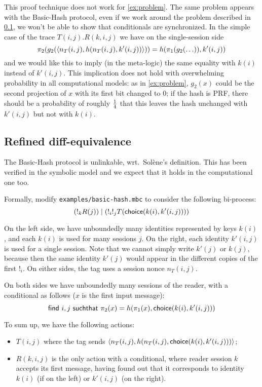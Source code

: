 \begin{example} \label{ex:indep}
  This proof technique does not work for \cref{ex:problem}.
  The same problem appears with the Basic-Hash protocol, even if we work around
the problem described in \cref{sec:refined-diff}, we won't be able to show
that conditionals are synchronized.  In the simple case of the trace
$T(i,j).R(k,i,j)$ we have
on the single-session side
$$\pi_2(g_2(\langle n_T(i,j),h(n_T(i,j),k'(i,j)) \rangle)) =
 h(\pi_1(g_2(\ldots)),k'(i,j))$$
and we would like this to imply (in the meta-logic)
the same equality with $k(i)$ instead of $k'(i,j)$.
This implication does not hold with overwhelming probability in all
computational models: as in \cref{ex:problem}, $g_2(x)$ could be the second
projection of $x$ with its first bit changed to $0$; if the hash is PRF,
there should be a probability of roughly $1 \over 4$ that this leaves
the hash unchanged with $k'(i,j)$ but not with $k(i)$.
\end{example}

\subsection{Refined diff-equivalence} \label{sec:refined-diff}

The Basic-Hash protocol is unlinkable, wrt.\ Solène's definition.
This has been verified in the symbolic model and we expect that it holds
in the computational one too.

Formally, modify \texttt{examples/basic-hash.mbc} to consider the
following bi-process:
$$(!_k R(j)) \mid (!_i !_j T(\mathsf{choice}(k(i),k'(i,j))))$$

On the left side, we have unboundedly many
identities represented by keys $k(i)$, and each $k(i)$ is used for
many sessions $j$.
On the right, each identity $k'(i,j)$ is used for a single session.
Note that we cannot simply write $k'(j)$ or $k(j)$, because then the
same identity $k'(j)$ would appear in the different copies of the
first $!_i$.
On either sides, the tag uses a session nonce $n_T(i,j)$.

On both sides we have unboundedly many sessions of the reader,
with a conditional as follows ($x$ is the first input message):
$$\mathsf{find} \ i,j \ \mathsf{suchthat} \ \pi_2(x) = 
h(\pi_1(x),\mathsf{choice}(k(i),k'(i,j)))$$

To sum up, we have the following actions:
\begin{itemize}
  \item $T(i,j)$ where the tag sends
    $\langle n_T(i,j),h(n_T(i,j),\mathsf{choice}(k(i),k'(i,j))) \rangle$;
  \item $R(k,i,j)$ is the only action with a conditional,
    where reader session $k$ accepts its first message,
    having found out that it corresponds to identity $k(i)$ (if on
    the left) or $k'(i,j)$ (on the right).
\end{itemize}

